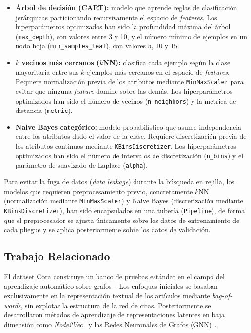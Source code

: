 \documentclass[conference,a4paper]{IEEEtran}
\begin{document}
\begin{itemize}
    \item \textbf{Árbol de decisión (CART):} modelo que aprende reglas 
    de clasificación jerárquicas particionando recursivamente el espacio 
    de \emph{features}. Los hiperparámetros optimizados han sido la 
    profundidad máxima del árbol (\texttt{max\_depth}), con valores 
    entre 3 y 10, y el número mínimo de ejemplos en un nodo hoja 
    (\texttt{min\_samples\_leaf}), con valores 5, 10 y 15.

    \item \textbf{$k$ vecinos más cercanos ($k$NN):} clasifica cada 
    ejemplo según la clase mayoritaria entre sus $k$ ejemplos más 
    cercanos en el espacio de \emph{features}. Requiere normalización 
    previa de los atributos mediante \texttt{MinMaxScaler} para evitar 
    que ninguna \emph{feature} domine sobre las demás. Los 
    hiperparámetros optimizados han sido el número de vecinos 
    (\texttt{n\_neighbors}) y la métrica de distancia 
    (\texttt{metric}).

    \item \textbf{Naive Bayes categórico:} modelo probabilístico que 
    asume independencia entre los atributos dado el valor de la clase. 
    Requiere discretización previa de los atributos continuos mediante 
    \texttt{KBinsDiscretizer}. Los hiperparámetros optimizados han sido 
    el número de intervalos de discretización (\texttt{n\_bins}) y el 
    parámetro de suavizado de Laplace (\texttt{alpha}).
\end{itemize}

Para evitar la fuga de datos (\emph{data leakage}) durante la búsqueda 
en rejilla, los modelos que requieren preprocesamiento previo, 
concretamente $k$NN (normalización mediante \texttt{MinMaxScaler}) 
y Naive Bayes (discretización mediante \texttt{KBinsDiscretizer}), han sido 
encapsulados en una tubería (\texttt{Pipeline}), de forma que el 
preprocesador se ajusta únicamente sobre los datos de entrenamiento 
de cada pliegue y se aplica posteriormente sobre los datos de 
validación.

\subsection{Trabajo Relacionado}

El dataset Cora constituye un banco de pruebas estándar en el campo 
del aprendizaje automático sobre grafos~\cite{mccallum2024}. Los 
enfoques iniciales se basaban exclusivamente en la representación 
textual de los artículos mediante \emph{bag-of-words}, sin explotar 
la estructura de la red de citas. Posteriormente se desarrollaron 
métodos de aprendizaje de representaciones latentes en baja dimensión como 
\emph{Node2Vec}~\cite{grover2016node2vec} y las Redes 
Neuronales de Grafos (GNN)~\cite{wu2022graph}. 
\end{document}
